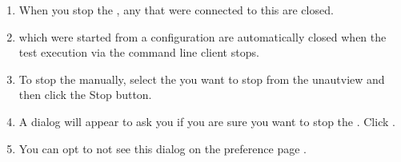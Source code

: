 \begin{enumerate}
\item When you stop the \gdagent{}, any \gdauts{} that were connected to this \gdagent{} are closed.
\item \gdauts{} which were started from a \jb{} configuration are automatically closed when the test execution via the command line client stops.
\item To stop the \gdaut{} manually, select the \gdaut{} you want to stop from the \jb{}unautview{} and then click the {Stop \gdaut{}} button. 
\item A dialog will appear to ask you if you are sure you want to stop the \gdaut{}. Click . 
\item You can opt to not see this dialog on the \jb{} preference page . 
\end{enumerate}
